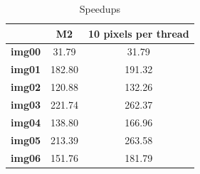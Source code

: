 \documentclass[a4paper]{article}
\begin{document}
\begin{table}[!ht]
\centering
\begin{tabular}{|c|c|c|}
\hline
               & \textbf{M2} & \textbf{10 pixels per thread} \\ \hline
\textbf{img00} & 31.79       & 31.79                         \\ \hline
\textbf{img01} & 182.80      & 191.32                        \\ \hline
\textbf{img02} & 120.88      & 132.26                        \\ \hline
\textbf{img03} & 221.74      & 262.37                        \\ \hline
\textbf{img04} & 138.80      & 166.96                        \\ \hline
\textbf{img05} & 213.39      & 263.58                        \\ \hline
\textbf{img06} & 151.76      & 181.79                        \\ \hline
\end{tabular}
\caption{Speedups}
\label{tab:darker_sp}
\end{table}
\FloatBarrier
\end{document}
